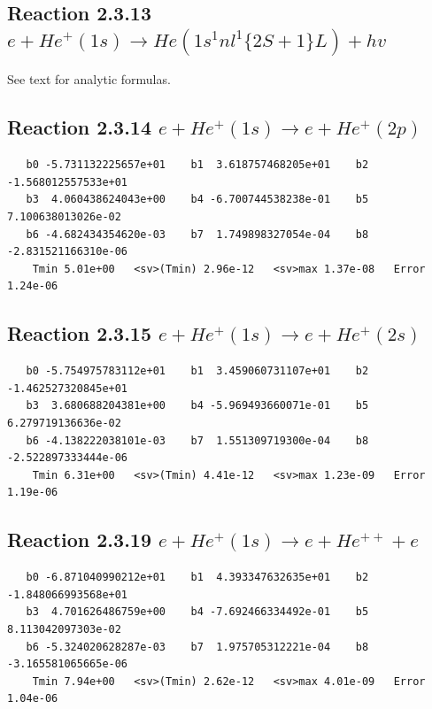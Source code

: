 \documentclass[12pt,dvipdfmx]{article}
\begin{document}
\newpage
\subsection{
Reaction 2.3.13 $  e + He^+(1s) \rightarrow He(1s^1nl^1 \{2S+1\}L) + hv$}

       See text for analytic formulas.

\newpage
\subsection{
Reaction 2.3.14 $  e + He^+(1s) \rightarrow e + He^+(2p)$}


\begin{small}\begin{verbatim}
   b0 -5.731132225657e+01    b1  3.618757468205e+01    b2 -1.568012557533e+01
   b3  4.060438624043e+00    b4 -6.700744538238e-01    b5  7.100638013026e-02
   b6 -4.682434354620e-03    b7  1.749898327054e-04    b8 -2.831521166310e-06
    Tmin 5.01e+00   <sv>(Tmin) 2.96e-12   <sv>max 1.37e-08   Error 1.24e-06
\end{verbatim}\end{small}

\newpage
\subsection{
Reaction 2.3.15 $  e + He^+(1s) \rightarrow e + He^+(2s)$}


\begin{small}\begin{verbatim}
   b0 -5.754975783112e+01    b1  3.459060731107e+01    b2 -1.462527320845e+01
   b3  3.680688204381e+00    b4 -5.969493660071e-01    b5  6.279719136636e-02
   b6 -4.138222038101e-03    b7  1.551309719300e-04    b8 -2.522897333444e-06
    Tmin 6.31e+00   <sv>(Tmin) 4.41e-12   <sv>max 1.23e-09   Error 1.19e-06
\end{verbatim}\end{small}

\newpage
\subsection{
Reaction 2.3.19 $  e + He^+(1s) \rightarrow e + He^{++} + e$}


\begin{small}\begin{verbatim}
   b0 -6.871040990212e+01    b1  4.393347632635e+01    b2 -1.848066993568e+01
   b3  4.701626486759e+00    b4 -7.692466334492e-01    b5  8.113042097303e-02
   b6 -5.324020628287e-03    b7  1.975705312221e-04    b8 -3.165581065665e-06
    Tmin 7.94e+00   <sv>(Tmin) 2.62e-12   <sv>max 4.01e-09   Error 1.04e-06
\end{verbatim}\end{small}
\end{document}
